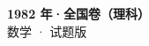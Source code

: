 \documentclass[zihao=-4, a4paper]{ctexart}
\begin{document}
\begin{center}
  {\Large\bfseries 1982 年·全国卷（理科）}\\[4pt]
  {\large 数学 · 试题版}
\end{center}
\medskip
{}

\end{document}
